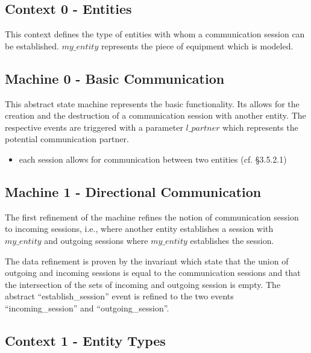 \documentclass[10pt,a4paper]{article}
\begin{document}
\subsection{Context 0 - Entities}
\label{sec:context-0-entities}

This context defines the type of entities with whom a communication session can
be established.  $my\_entity$ represents the piece of equipment which is
modeled.



\subsection{Machine 0 - Basic Communication}
\label{sec:machine-0-basic}

This abstract state machine represents the basic functionality. Its allows
for the creation and the destruction of a communication session with another
entity. The respective events are triggered with a parameter $l\_partner$ which
represents the potential communication partner.

\begin{itemize}
\item each session allows for communication between two entities (cf. §3.5.2.1)
\end{itemize}



\subsection{Machine 1 - Directional Communication}
\label{sec:mach-1-direct}

The first refinement of the machine refines the notion of communication session
to incoming sessions, i.e., where another entity establishes a session with
$my\_entity$ and outgoing sessions where $my\_entity$ establishes the session.

The data refinement is proven by the invariant which state that the union of
outgoing and incoming sessions is equal to the communication sessions and that
the intersection of the sets of incoming and outgoing session is empty. The
abstract ``establish\_session'' event is refined to the two events
``incoming\_session'' and ``outgoing\_session''.



\subsection{Context 1 - Entity Types}
\label{sec:context-1-entity}
\end{document}
